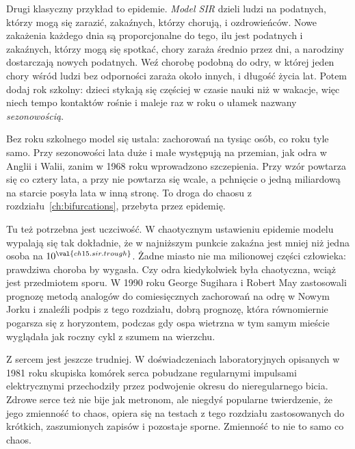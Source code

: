 Drugi klasyczny przykład to epidemie. \emph{Model SIR} dzieli ludzi na
podatnych, którzy mogą się zarazić, zakaźnych, którzy chorują, i
ozdrowieńców. Nowe zakażenia każdego dnia są proporcjonalne do tego, ilu jest
podatnych i zakaźnych, którzy mogą się spotkać, chory zaraża średnio przez
 dni, a narodziny dostarczają nowych podatnych. Weź
chorobę podobną do odry, w której jeden chory wśród ludzi bez odporności
zaraża około  innych, i długość życia 
lat. Potem dodaj rok szkolny: dzieci stykają się częściej w czasie nauki niż
w wakacje, więc niech tempo kontaktów rośnie i maleje raz w roku o ułamek
nazwany \emph{sezonowością}.



\noindent
Bez roku szkolnego model się ustala:  zachorowań na
tysiąc osób, co roku tyle samo. Przy sezonowości  lata duże
i małe występują na przemian, jak odra w Anglii i Walii, zanim w 1968 roku
wprowadzono szczepienia. Przy  wzór powtarza się co cztery
lata, a przy  nie powtarza się wcale, a pchnięcie o jedną
miliardową na starcie posyła lata w inną stronę. To droga do chaosu z
rozdziału~\ref{ch:bifurcations}, przebyta przez epidemię.

Tu też potrzebna jest uczciwość. W chaotycznym ustawieniu epidemie modelu
wypalają się tak dokładnie, że w najniższym punkcie zakaźna jest mniej niż
jedna osoba na $10^{\val{ch15.sir.trough}}$. Żadne miasto nie ma milionowej
części człowieka: prawdziwa choroba by wygasła. Czy odra kiedykolwiek
była chaotyczna, wciąż jest przedmiotem sporu. W 1990 roku George Sugihara i
Robert May zastosowali prognozę metodą analogów do comiesięcznych zachorowań
na odrę w Nowym Jorku i znaleźli podpis z tego rozdziału, dobrą prognozę,
która równomiernie pogarsza się z horyzontem, podczas gdy ospa wietrzna w tym
samym mieście wyglądała jak roczny cykl z szumem na wierzchu.

Z sercem jest jeszcze trudniej. W doświadczeniach laboratoryjnych opisanych w
1981 roku skupiska komórek serca pobudzane regularnymi impulsami elektrycznymi
przechodziły przez podwojenie okresu do nieregularnego bicia. Zdrowe serce też
nie bije jak metronom, ale niegdyś popularne twierdzenie, że jego zmienność to
chaos, opiera się na testach z tego rozdziału zastosowanych do krótkich,
zaszumionych zapisów i pozostaje sporne. Zmienność to nie to samo co chaos.

